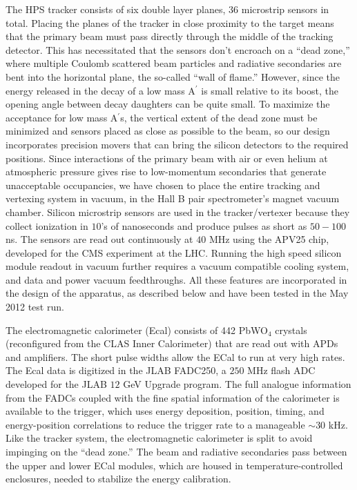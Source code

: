 The HPS tracker consists of six double layer planes, 36 microstrip sensors in total. Placing the planes of the tracker in close proximity to the target means that the primary beam must pass directly through the middle of the tracking detector. This has necessitated that the sensors don't encroach on a ``dead zone,'' where multiple Coulomb scattered beam particles and radiative secondaries are bent into the horizontal plane, the so-called ``wall of flame.''  However, since the energy released in the decay of a low mass A$^\prime$ is small relative to its boost, the opening angle between decay daughters can be quite small. To maximize the acceptance for low mass A$^\prime$s, the vertical extent of the dead zone must be minimized and sensors placed as close as possible to the beam, so our design incorporates precision movers that can bring the silicon detectors  to the required positions. Since interactions of the primary beam with air or even helium at atmospheric pressure gives rise to low-momentum secondaries that generate unacceptable occupancies, we have chosen to place the entire tracking and vertexing system in vacuum, in the Hall B pair spectrometer's magnet vacuum chamber. Silicon microstrip sensors are used in the tracker/vertexer because they collect ionization in $10$'s of nanoseconds and produce pulses as short as $50-100$ ns. The sensors are read out continuously at $40$ MHz using the APV25 chip, developed for the CMS experiment at the LHC. Running the high speed silicon module readout in vacuum further requires a vacuum compatible cooling system, and data and power vacuum feedthroughs. All these features are incorporated  in the design of the apparatus, as described below and have been tested in the May 2012 test run.


The electromagnetic calorimeter (Ecal) consists of 442 PbWO$_4$ crystals (reconfigured from the CLAS Inner Calorimeter) that are read out with APDs and amplifiers. The short  pulse widths allow the ECal to run at very high rates. The Ecal data is digitized in the JLAB FADC250, a $250$ MHz flash ADC developed for the JLAB $12$ GeV Upgrade program.  The full analogue information from the FADCs coupled with the fine spatial information of the calorimeter is available to the trigger, which uses energy deposition, position, timing, and energy-position correlations to reduce the trigger rate to a manageable $\sim 30$ kHz. Like the tracker system, the electromagnetic calorimeter is split to avoid impinging on the ``dead zone.'' The beam and radiative secondaries pass between the upper and lower ECal modules, which are housed in temperature-controlled enclosures, needed to stabilize the energy calibration. 

